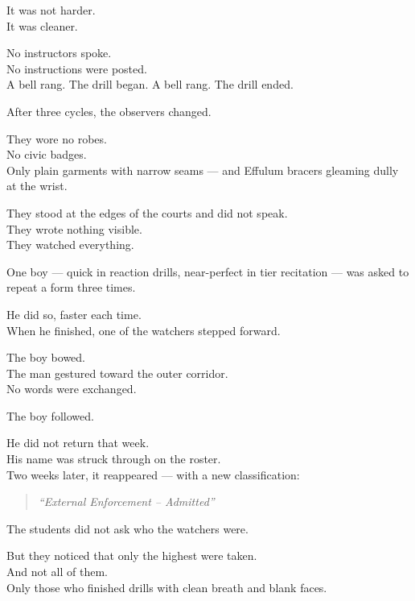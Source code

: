 \documentclass[12pt]{article}
\begin{document}
It was not harder.\\
It was cleaner.

No instructors spoke.\\
No instructions were posted.\\
A bell rang. The drill began. A bell rang. The drill ended.

\vspace{1em}

After three cycles, the observers changed.

They wore no robes.\\
No civic badges.\\
Only plain garments with narrow seams — and Effulum bracers gleaming dully at the wrist.

They stood at the edges of the courts and did not speak.\\
They wrote nothing visible.\\
They watched everything.

\vspace{1em}

One boy — quick in reaction drills, near-perfect in tier recitation — was asked to repeat a form three times.

He did so, faster each time.\\
When he finished, one of the watchers stepped forward.

The boy bowed.\\
The man gestured toward the outer corridor.\\
No words were exchanged.

The boy followed.

He did not return that week.\\
His name was struck through on the roster.\\
Two weeks later, it reappeared — with a new classification:

\begin{quote}
\textit{“External Enforcement – Admitted”}
\end{quote}

\vspace{1em}

The students did not ask who the watchers were.

But they noticed that only the highest were taken.\\
And not all of them.\\

Only those who finished drills with clean breath and blank faces.\\
\end{document}
